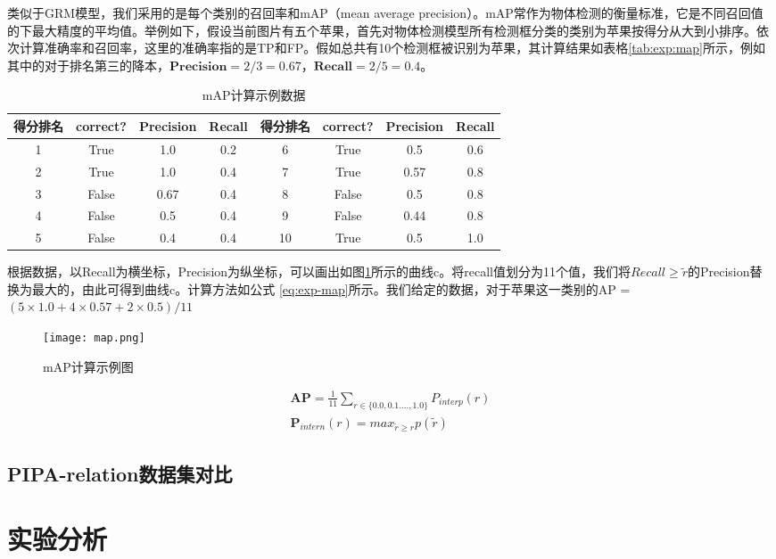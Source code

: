 类似于GRM模型，我们采用的是每个类别的召回率和mAP（mean average precision）。mAP常作为物体检测的衡量标准，它是不同召回值的下最大精度的平均值。举例如下，假设当前图片有五个苹果，首先对物体检测模型所有检测框分类的类别为苹果按得分从大到小排序。依次计算准确率和召回率，这里的准确率指的是TP和FP。假如总共有10个检测框被识别为苹果，其计算结果如表格\ref{tab:exp:map}所示，例如其中的对于排名第三的降本，$\textbf{Precision} = 2/3 = 0.67$，$\textbf{Recall} = 2/5 = 0.4$。
\begin{table}[htpb]
  \centering
  \caption{mAP计算示例数据}
  \label{tab:exp-map}
  \begin{tabular}{c|c|c|c|c|c|c|c}
    \toprule
    \textbf{得分排名} & \textbf{correct?} & \textbf{Precision} & \textbf{Recall}  & \textbf{得分排名} & \textbf{correct?} & \textbf{Precision} & \textbf{Recall}   \\
    \midrule
    1 & True & 1.0 & 0.2  & 6 & True & 0.5 & 0.6    \\
    \midrule
    2 &  True & 1.0 & 0.4  & 7 & True & 0.57 & 0.8  \\
    \midrule
    3 & False & 0.67 & 0.4  & 8 & False & 0.5 & 0.8  \\
    \midrule
    4 & False & 0.5 & 0.4   & 9 & False & 0.44 & 0.8 \\
    \midrule
    5 & False & 0.4 & 0.4  & 10 & True & 0.5 & 1.0 \\
    \bottomrule
  \end{tabular}
\end{table}
根据数据，以Recall为横坐标，Precision为纵坐标，可以画出如图\ref{fig:exp-map}所示的曲线c。将recall值划分为11个值，我们将$Recall \geq \widetilde{r}$的Precision替换为最大的，由此可得到曲线c。计算方法如公式
\ref{eq:exp-map}所示。我们给定的数据，对于苹果这一类别的AP = $(5 \times 1.0 + 4 \times 0.57 + 2 \times 0.5)/11$
\begin{figure}[htpb]
	\centering
	\texttt{[image: map.png]}
    \caption{mAP计算示例图}
	\vspace*{-3.5mm}
	\label{fig:exp-map}
\end{figure}
\begin{equation} \label{eq:exp-map}
\begin{split}
    \mathbf{AP} = \frac{1}{11}\sum_{r \in \{0.0,0.1....,1.0\}}P_{interp}(r) \\
    \mathbf{P}_{intern}(r) = max_{\widetilde{r} \geq r}p(\widetilde{r})
\end{split}
\end{equation}

\subsection{PIPA-relation数据集对比}

\section{实验分析}


